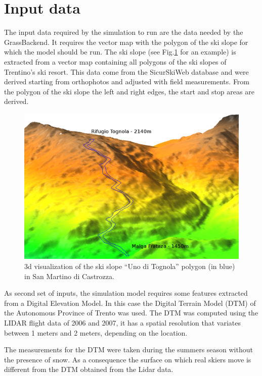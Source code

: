\documentclass[12pt,a4paper,twoside]{book}
\begin{document}
\section{Input data}
The input data required by the simulation to run are the data needed by the GrassBackend. It requires the vector map with the polygon of the ski slope for which the model should be run. The ski slope (see Fig.\ref{uno_tognola_3d} for an example) is extracted from a vector map containing all polygons of the ski slopes of Trentino's ski resort. This data come from the SicurSkiWeb database and were derived starting from orthophotos and adjusted with field measurements. From the polygon of the ski slope the left and right edges, the start and stop areas are derived.

\begin{figure}[!h]
  \begin{center}
    \includegraphics[width=\textwidth]{images/uno_tognola_3d.eps}
    \caption{3d visualization of the ski slope ``Uno di Tognola'' polygon (in blue) in San Martino di Castrozza.}\label{uno_tognola_3d}
  \end{center}
\end{figure}

As second set of inputs, the simulation model requires some features extracted from a Digital Elevation Model. In this case the Digital Terrain Model (DTM) of the Autonomous Province of Trento was used. The DTM was computed using the LIDAR flight data of 2006 and 2007, it has a spatial resolution that variates between 1 meters and 2 meters, depending on the location.

The measurements for the DTM were taken during the summers season without the presence of snow. As a consequence the surface on which real skiers move is different from the DTM obtained from the Lidar data.
\end{document}
